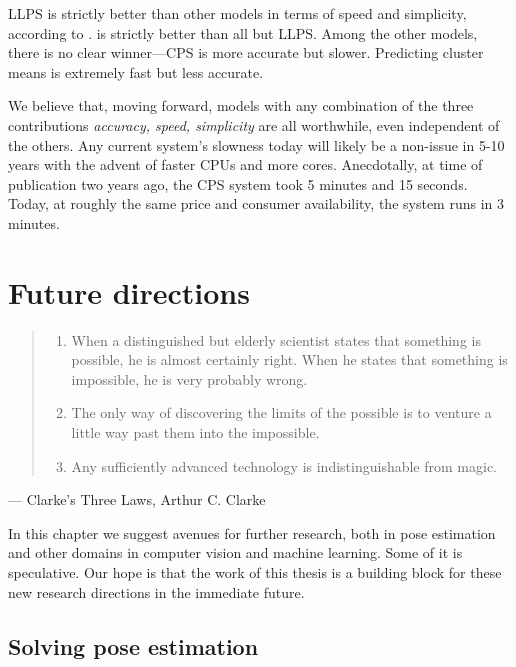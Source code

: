 LLPS is strictly better than other models in terms of speed and simplicity, 
according to . \citet{deva2011} is strictly better than all 
but LLPS.  Among the other models, there is no clear winner---CPS is more 
accurate but slower.  Predicting cluster means is extremely fast but less 
accurate.

We believe that, moving forward, models with any combination of the three 
contributions {\em accuracy, speed, simplicity} are all worthwhile, even 
independent of the others. Any current system's slowness today will likely be a 
non-issue in 5-10 years with the advent of faster CPUs and more cores.  
Anecdotally, at time of publication two years ago, the CPS system took 5 
minutes and 15 seconds.  Today, at roughly the same price and consumer 
availability, the system runs in 3 minutes.


\chapter{Future directions}
\begin{quote}
\begin{enumerate}
  \setlength{\itemsep}{1pt}
  \setlength{\parskip}{0pt}
  \setlength{\parsep}{0pt}
\item When a distinguished but elderly scientist states that something is 
possible, he is almost certainly right. When he states that something is 
impossible, he is very probably wrong.
\item The only way of discovering the limits of the possible is to venture a 
little way past them into the impossible.
\item Any sufficiently advanced technology is indistinguishable from magic.
  \setlength{\itemsep}{16pt}
\end{enumerate}
\end{quote}
\hfill--- Clarke's Three Laws, Arthur C. Clarke
\vspace{0.5in}

In this chapter we suggest avenues for further research, both in pose 
estimation and other domains in computer vision and machine learning.  Some of 
it is speculative.  Our hope is that the work of this thesis is a building 
block for these new research directions in the immediate future. 


\section{Solving pose estimation}

